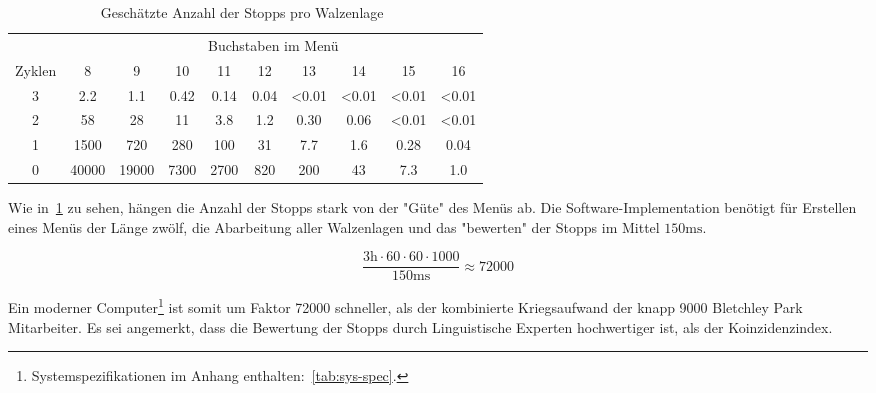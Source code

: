 \newpage
\begin{table}[htbp]
	\centering
	\caption{Geschätzte Anzahl der Stopps pro Walzenlage~\autocite{enwiki:bombe}}
	\label{tab:num-stops}
	\begin{tabular}{|c||c|c|c|c|c|c|c|c|c|}
		\hline
		                                    &              \multicolumn{9}{c|}{Buchstaben im Menü}               \\ 
		              Zyklen                &   8   &   9   &  10  &  11  &  12  &  13   &  14   &  15   &  16   \\
		\hhline{|=||=|=|=|=|=|=|=|=|=|}
						 3 					&  2.2  &  1.1  & 0.42 & 0.14 & 0.04 & <0.01 & <0.01 & <0.01 & <0.01 \\ \hline
		                 2                  &  58   &  28   &  11  & 3.8  & 1.2  & 0.30  & 0.06  & <0.01 & <0.01 \\ \hline
		                 1                  & 1500  &  720  & 280  & 100  &  31  &  7.7  &  1.6  & 0.28  & 0.04  \\ \hline
		                 0                  & 40000 & 19000 & 7300 & 2700 & 820  &  200  &  43   &  7.3  &  1.0  \\ \hline
	\end{tabular}
\end{table}


Wie in~\cref{tab:num-stops} zu sehen, hängen die Anzahl der Stopps stark von der "Güte" des Menüs ab.
Die Software-Implementation benötigt für Erstellen eines Menüs der Länge zwölf, die Abarbeitung aller Walzenlagen und das "bewerten" der Stopps im Mittel
$150\si{\ms}$.

\[
\frac{3\si{\hour} \cdot 60 \cdot 60 \cdot 1000}{150\si{\ms}} \approx 72000
\]

Ein moderner Computer\footnote{Systemspezifikationen im Anhang enthalten:~\cref{tab:sys-spec}.} ist somit um Faktor 72000 schneller, als der kombinierte Kriegsaufwand der knapp 9000 Bletchley Park Mitarbeiter.
Es sei angemerkt, dass die Bewertung der Stopps durch Linguistische Experten hochwertiger ist, als der Koinzidenzindex.
